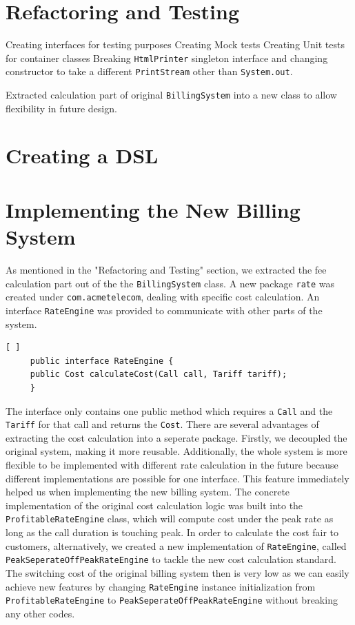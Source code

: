 \documentclass[a4paper,12pt,oneside,final]{article}
\begin{document}
\section{Refactoring and Testing} %
Creating interfaces for testing purposes
Creating Mock tests
Creating Unit tests for container classes
Breaking \verb+HtmlPrinter+ singleton interface and changing constructor to take a different \verb+PrintStream+ other than \verb+System.out+.

Extracted calculation part of original \verb+BillingSystem+ into a new class to allow flexibility in future design.

\section{Creating a DSL} %

\section{Implementing the New Billing System}  %
As mentioned in the "Refactoring and Testing" section, we extracted the fee calculation part out of the the \verb+BillingSystem+ class. A new package \verb+rate+ was created under \verb+com.acmetelecom+, dealing with specific cost calculation. An interface \verb+RateEngine+ was provided to communicate with other parts of the system. 

\begin{lstlisting}[ ]
     public interface RateEngine {
   	 public Cost calculateCost(Call call, Tariff tariff);
     }
\end{lstlisting}

The interface only contains one public method which requires a \verb+Call+ and the \verb+Tariff+ for that call and returns the \verb+Cost+.  There are several advantages of extracting the cost calculation into a seperate package. Firstly, we decoupled the original system, making it more reusable. Additionally, the whole system is more flexible to be implemented with different rate calculation in the future because different implementations are possible for one interface. This feature immediately helped us when implementing the new billing system. The concrete implementation of the original cost calculation logic was built into the \verb+ProfitableRateEngine+ class, which will compute cost under the peak rate as long as the call duration is touching peak. In order to calculate the cost fair to customers, alternatively, we created a new implementation of \verb+RateEngine+, called \verb+PeakSeperateOffPeakRateEngine+ to tackle the new cost calculation standard. The switching cost of the original billing system then is very low as we can easily achieve new features by changing \verb+RateEngine+ instance initialization from \verb+ProfitableRateEngine+ to \verb+PeakSeperateOffPeakRateEngine+ without breaking any other codes.
\end{document}
